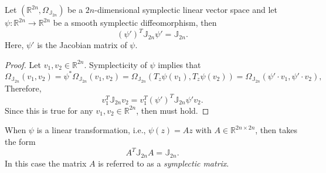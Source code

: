 \begin{proposition}
Let $(\mathbb R^{2n}, \Omega_{\mathbb J_{2n}})$ be a $2n$-dimensional symplectic linear vector space and let $\psi:\mathbb R^{2n} \to \mathbb R^{2n}$ be a smooth symplectic diffeomorphism, then
\begin{equation} \label{eq:2.20}
	(\psi')^T \mathbb J_{2n} \psi' =  \mathbb J_{2n}.	
\end{equation}
Here, $\psi'$ is the Jacobian matrix of $\psi$.
\end{proposition}
\begin{proof}
Let $v_1,v_2\in \mathbb R^{2n}$. Symplecticity of $\psi$ implies that
\begin{equation*}
	\Omega_{\mathbb J_{2n}}(v_1,v_2) = \psi^*\Omega_{\mathbb J_{2n}}(v_1,v_2) = \Omega_{\mathbb J_{2n}}( T_z \psi(v_1) , T_z \psi (v_2) ) = \Omega_{\mathbb J_{2n}}( \psi'\cdot v_1,\psi'\cdot v_2 ),
\end{equation*}
Therefore,
\begin{equation*}
	v_1^T \mathbb J_{2n} v_2 = v_1^T (\psi')^T \mathbb J_{2n} \psi' v_2.
\end{equation*}
Since this is true for any $v_1,v_2\in \mathbb R^{2n}$, then  must hold.
\end{proof}
When $\psi$ is a linear transformation, i.e., $\psi(z) = Az$ with $A\in \mathbb R^{2n\times 2n}$, then  takes the form
\begin{equation} \label{eq:2.201}
	A^T \mathbb J_{2n} A = \mathbb J_{2n}.
\end{equation}
In this case the matrix $A$ is referred to as a \emph{symplectic matrix}.

